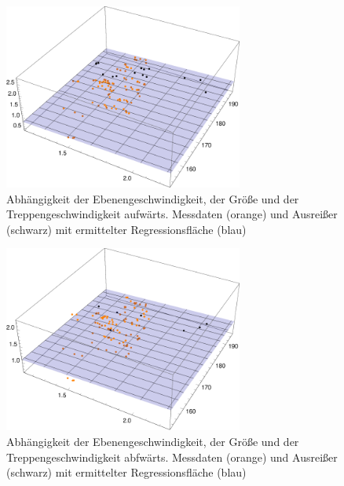 \begin{figure}[htpb]
	\centering
	\includegraphics[width=0.7\textwidth]{abbildungen/regression/2012_2017_verbund/ohneausreisser/auf-ebene-groesse.pdf}
	
	\caption{Abhängigkeit der Ebenengeschwindigkeit, der Größe und der Treppengeschwindigkeit aufwärts. Messdaten (orange) und Ausreißer (schwarz) mit ermittelter Regressionsfläche (blau)}
	\label{fig:2012_und_2017_OA_auf_ebene_groesse}
\end{figure}



\begin{figure}[htpb]
	\centering
	\includegraphics[width=0.7\textwidth]{abbildungen/regression/2012_2017_verbund/ohneausreisser/ab-ebene-groesse.pdf}
	
	\caption{Abhängigkeit der Ebenengeschwindigkeit, der Größe und der Treppengeschwindigkeit abfwärts. Messdaten (orange) und Ausreißer (schwarz) mit ermittelter Regressionsfläche (blau)}
	\label{fig:2012_und_2017_OA_ab_ebene_groesse}
\end{figure}

